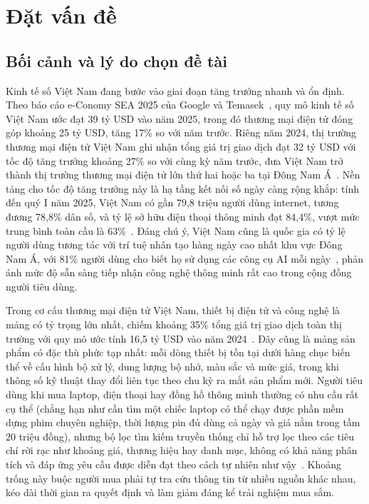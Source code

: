 \chapter{Đặt vấn đề}
\label{chap:c1_introduction}

\section{Bối cảnh và lý do chọn đề tài}
\label{sec:c1_context}

Kinh tế số Việt Nam đang bước vào giai đoạn tăng trưởng nhanh và ổn định. Theo báo cáo e-Conomy SEA 2025 của Google và Temasek~\cite{economy_sea_2025}, quy mô kinh tế số Việt Nam ước đạt 39 tỷ USD vào năm 2025, trong đó thương mại điện tử đóng góp khoảng 25 tỷ USD, tăng 17\% so với năm trước. Riêng năm 2024, thị trường thương mại điện tử Việt Nam ghi nhận tổng giá trị giao dịch đạt 32 tỷ USD với tốc độ tăng trưởng khoảng 27\% so với cùng kỳ năm trước, đưa Việt Nam trở thành thị trường thương mại điện tử lớn thứ hai hoặc ba tại Đông Nam Á~\cite{vecom2024}. Nền tảng cho tốc độ tăng trưởng này là hạ tầng kết nối số ngày càng rộng khắp: tính đến quý I năm 2025, Việt Nam có gần 79,8 triệu người dùng internet, tương đương 78,8\% dân số, và tỷ lệ sở hữu điện thoại thông minh đạt 84,4\%, vượt mức trung bình toàn cầu là 63\%~\cite{datareportal_2025}. Đáng chú ý, Việt Nam cũng là quốc gia có tỷ lệ người dùng tương tác với trí tuệ nhân tạo hàng ngày cao nhất khu vực Đông Nam Á, với 81\% người dùng cho biết họ sử dụng các công cụ AI mỗi ngày~\cite{economy_sea_2025}, phản ánh mức độ sẵn sàng tiếp nhận công nghệ thông minh rất cao trong cộng đồng người tiêu dùng.

Trong cơ cấu thương mại điện tử Việt Nam, thiết bị điện tử và công nghệ là mảng có tỷ trọng lớn nhất, chiếm khoảng 35\% tổng giá trị giao dịch toàn thị trường với quy mô ước tính 16,5 tỷ USD vào năm 2024~\cite{statista_vn_electronics}. Đây cũng là mảng sản phẩm có đặc thù phức tạp nhất: mỗi dòng thiết bị tồn tại dưới hàng chục biến thể về cấu hình bộ xử lý, dung lượng bộ nhớ, màu sắc và mức giá, trong khi thông số kỹ thuật thay đổi liên tục theo chu kỳ ra mắt sản phẩm mới. Người tiêu dùng khi mua laptop, điện thoại hay đồng hồ thông minh thường có nhu cầu rất cụ thể (chẳng hạn như cần tìm một chiếc laptop có thể chạy được phần mềm dựng phim chuyên nghiệp, thời lượng pin đủ dùng cả ngày và giá nằm trong tầm 20 triệu đồng), nhưng bộ lọc tìm kiếm truyền thống chỉ hỗ trợ lọc theo các tiêu chí rời rạc như khoảng giá, thương hiệu hay danh mục, không có khả năng phân tích và đáp ứng yêu cầu được diễn đạt theo cách tự nhiên như vậy~\cite{chen2021conversational}. Khoảng trống này buộc người mua phải tự tra cứu thông tin từ nhiều nguồn khác nhau, kéo dài thời gian ra quyết định và làm giảm đáng kể trải nghiệm mua sắm.

